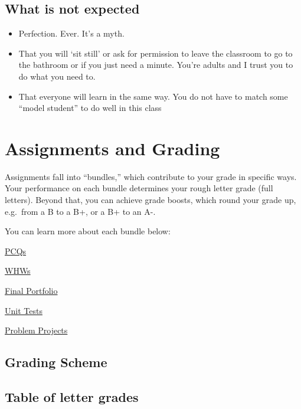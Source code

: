 \documentclass[
  letterpaper,
  DIV=11,
  numbers=noendperiod]{scrartcl}
\providecommand{\tightlist}{%
  \setlength{\itemsep}{0pt}\setlength{\parskip}{0pt}}\usepackage{longtable,booktabs,array}
\begin{document}
\subsection{What is not expected}

\begin{itemize}
\tightlist
\item
  Perfection. Ever. It's a myth.
\item
  That you will `sit still' or ask for permission to leave the classroom
  to go to the bathroom or if you just need a minute. You're adults and
  I trust you to do what you need to.
\item
  That everyone will learn in the same way. You do not have to match
  some ``model student'' to do well in this class
\end{itemize}

\section{Assignments and Grading}\label{assignments}

Assignments fall into ``bundles,'' which contribute to your grade in
specific ways. Your performance on each bundle determines your rough
letter grade (full letters). Beyond that, you can achieve grade boosts,
which round your grade up, e.g.~from a B to a B+, or a B+ to an A-.

You can learn more about each bundle below:

\hyperref[pcqs]{PCQs}

\hyperref[whws]{WHWs}

\hyperref[portfolio]{Final Portfolio}

\hyperref[tests]{Unit Tests}

\hyperref[problemproject]{Problem Projects}

\subsection{Grading Scheme}\label{gradingscheme}

\subsection{Table of letter grades}\label{table-of-letter-grades}
\end{document}
